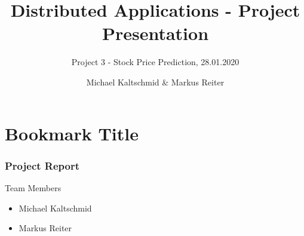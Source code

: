 \documentclass[11pt,t,usepdftitle=false,aspectratio=169]{beamer}
\title[Distributed Applications - Project Presentation]{Distributed Applications - Project Presentation}
\subtitle{Project 3 - Stock Price Prediction, 28.01.2020}
\author[Michael Kaltschmid \& Markus Reiter]{Michael Kaltschmid \& Markus Reiter}
\begin{document}



\section{Bookmark Title}

\begin{frame}
\frametitle{Project Report}
    Team Members
    \begin{itemize}
        \item Michael Kaltschmid
        \item Markus Reiter
    \end{itemize}
\end{frame}
\end{document}
